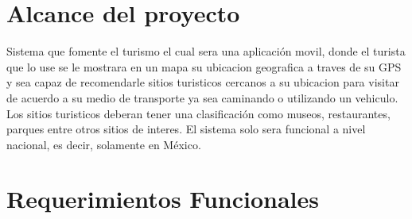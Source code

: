 \documentclass{article}
\begin{document}
\section{Alcance del proyecto}
\justifying
Sistema que fomente el turismo el cual sera una aplicación movil, donde el turista que lo use se le mostrara en un mapa su ubicacion geografica a traves de su GPS y sea capaz de recomendarle sitios turisticos cercanos a su ubicacion para visitar de acuerdo a su medio de transporte ya sea caminando o utilizando un vehiculo. Los sitios turisticos deberan tener una clasificación como museos, restaurantes, parques entre otros sitios de interes. El sistema solo sera funcional a nivel nacional, es decir, solamente en México.

\section{Requerimientos Funcionales}
\end{document}
